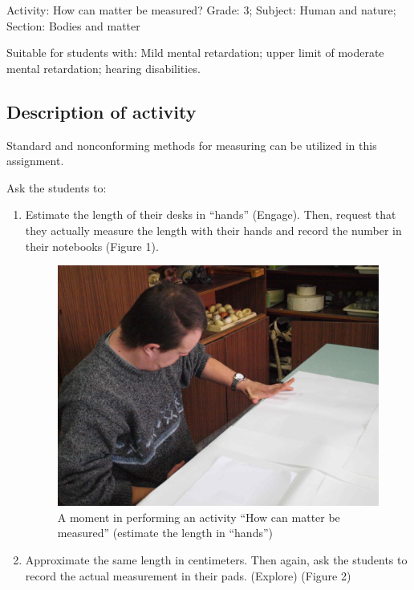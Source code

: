 \documentclass[11.5pt]{sig-alternate} %
\begin{document}
\begin{large}
Activity: How can matter be measured? Grade: 3; Subject: Human and nature; Section: Bodies and matter

Suitable for students with: Mild mental retardation; upper limit of moderate mental retardation; hearing disabilities.

\subsection*{Description of activity}

Standard and nonconforming methods for measuring can be utilized in this assignment.

Ask the students to: 
\begin{enumerate}
    \item Estimate the length of their desks in “hands” (Engage). Then, request that they actually measure the length with their hands and record the number in their notebooks (Figure 1).
\begin{figure}[h]
    \centering
    \includegraphics[width=0.95\linewidth]{images/fig1.jpg}
    \caption{A moment in performing an activity “How can matter be measured” (estimate the length in “hands”)}
\end{figure}
   
    \item Approximate the same length in centimeters. Then again, ask the students to record the actual measurement in their pads. (Explore) (Figure 2)


\end{enumerate}
\end{large}
\end{document}
